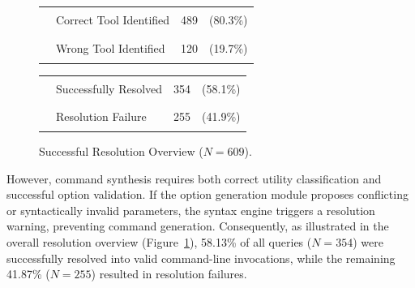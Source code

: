 \FloatBarrier
\begin{figure}[htbp]
\centering
\begin{minipage}{0.48\textwidth}
  \centering
  \vspace{0.3cm}
  
  \small
  \begin{tabular}{llcc}
    \textcolor{primaryblue}{\rule{1.2ex}{1.2ex}} & Correct Tool Identified & 489 & (80.3\%) \\
    \textcolor{primaryorange}{\rule{1.2ex}{1.2ex}} & Wrong Tool Identified & 120 & (19.7\%) \\
  \end{tabular}
  \vspace{0.2cm}
  \caption{Overall Tool Selection Accuracy ($N=609$).}
  \label{fig:overall_tool_accuracy}
\end{minipage}
\hfill
\begin{minipage}{0.48\textwidth}
  \centering
  \vspace{0.3cm}
  
  \small
  \begin{tabular}{llcc}
    \textcolor{primarygreen}{\rule{1.2ex}{1.2ex}} & Successfully Resolved & 354 & (58.1\%) \\
    \textcolor{primaryred}{\rule{1.2ex}{1.2ex}} & Resolution Failure & 255 & (41.9\%) \\
  \end{tabular}
  \vspace{0.2cm}
  \caption{Successful Resolution Overview ($N=609$).}
  \label{fig:resolution_overview}
\end{minipage}
\end{figure}
\FloatBarrier

However, command synthesis requires both correct utility classification and successful option validation. If the option generation module proposes conflicting or syntactically invalid parameters, the syntax engine triggers a resolution warning, preventing command generation. Consequently, as illustrated in the overall resolution overview (Figure~\ref{fig:resolution_overview}), 58.13\% of all queries ($N=354$) were successfully resolved into valid command-line invocations, while the remaining 41.87\% ($N=255$) resulted in resolution failures.

